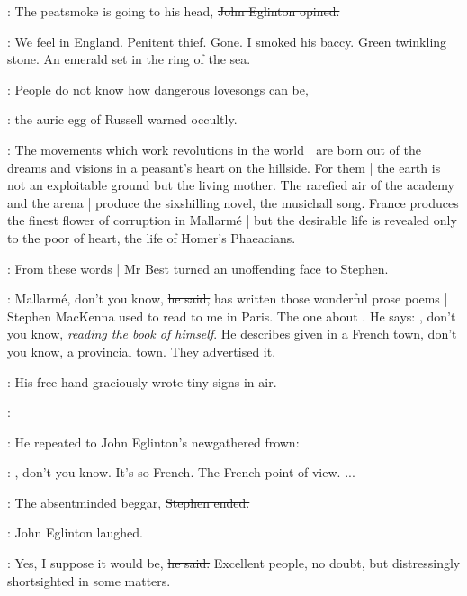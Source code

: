 \eglinton:
The peatsmoke is going to his head,
\sout{John Eglinton opined.}

\StephenInt:
We feel in England.
Penitent thief.
Gone.
I smoked his baccy.
Green twinkling stone.
An emerald set in the ring of the sea.

\AErussell:
People do not know how dangerous lovesongs can be,

:
the auric egg of Russell warned occultly.

\AErussell:
The movements which work revolutions in the world |
are born out of the dreams and visions in a peasant's heart on the hillside.
For them |
the earth is not an exploitable ground but the living mother.
The rarefied air of the academy and the arena |
produce the sixshilling novel,
the musichall song.
France produces the finest flower of corruption in Mallarmé |
but the desirable life is revealed only to the poor of heart,
the life of Homer's Phaeacians.

:
From these words |
Mr Best turned an unoffending face to Stephen.

\best:
Mallarmé,
don't you know,
\sout{he said,}
has written those wonderful prose poems |
Stephen MacKenna used to read to me in Paris.
The one about .
He says:
,
don't you know,
\emph{reading the book of himself}.
He describes  given in a French town,
don't you know,
a provincial town.
They advertised it.

:
His free hand graciously wrote tiny signs in air.

\best:
\begin{verse}
\end{verse}

:
He repeated to John Eglinton's newgathered frown:

\best:
,
don't you know.
It's so French.
The French point of view.
 ...

\Stephen:
The absentminded beggar,
\sout{Stephen ended.}

:
John Eglinton laughed.

\eglinton:
Yes,
I suppose it would be,
\sout{he said.}
Excellent people,
no doubt,
but distressingly shortsighted in some matters.

